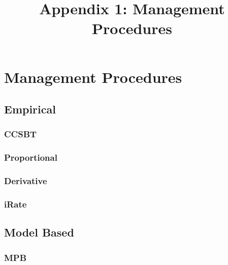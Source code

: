 \documentclass[11pt]{article}
\title{\textbf{Appendix 1:} Management Procedures}
\author{}
\begin{document}
\maketitle

\tableofcontents
\newpage\clearpage

\section{Management Procedures}

\subsection{Empirical}
 
\subsubsection{CCSBT}
 


\newpage\clearpage
\subsubsection{Proportional}



\newpage\clearpage
\subsubsection{Derivative}




\newpage\clearpage
\subsubsection{iRate}




\newpage\clearpage
\subsection{Model Based}

\subsubsection{MPB}



\newpage\clearpage\clearpage
 
 
\end{document}
